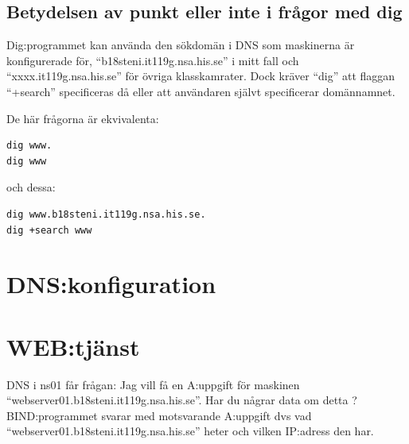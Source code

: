 \documentclass[swedish,10pt,a4paper]{article}
\begin{document}




\subsection{Betydelsen av punkt eller inte i frågor med dig}

Dig:programmet kan använda den sökdomän i DNS som maskinerna är konfigurerade för, ``b18steni.it119g.nsa.his.se'' i mitt fall och ``xxxx.it119g.nsa.his.se''
för övriga klasskamrater.
Dock kräver ``dig'' att flaggan ``+search'' specificeras då eller att användaren självt specificerar domännamnet.

De här frågorna är ekvivalenta:
\begin{verbatim}
dig www.
dig www
\end{verbatim}
och dessa:
\begin{verbatim}
dig www.b18steni.it119g.nsa.his.se.
dig +search www
\end{verbatim}

\section{DNS:konfiguration}\label{sec:dns_config}

\section{WEB:tjänst}\label{sec:httpd_config}

DNS i ns01 får frågan:
Jag vill få en A:uppgift för maskinen ``webserver01.b18steni.it119g.nsa.his.se''.
Har du någrar data om detta ?
BIND:programmet svarar med motsvarande A:uppgift dvs vad ``webserver01.b18steni.it119g.nsa.his.se''
heter och vilken IP:adress den har.
\end{document}
